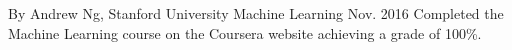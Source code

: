 \begin{cventries}
  \cventry
    {By Andrew Ng, Stanford University}
    {Machine Learning}
    { }
    {Nov. 2016}
    {
      Completed the Machine Learning course on the Coursera website achieving a grade of 100\%.
    }
\end{cventries}

